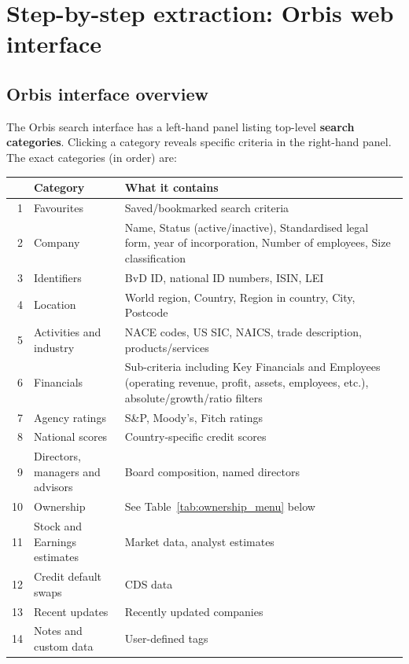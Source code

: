 \documentclass[11pt,a4paper]{article}
\newcommand{\menu}[1]{\textsf{#1}}
\begin{document}
\section{Step-by-step extraction: Orbis web interface}\label{sec:steps}

\subsection{Orbis interface overview}\label{sec:interface}

The Orbis search interface has a left-hand panel listing top-level \textbf{search categories}. Clicking a category reveals specific criteria in the right-hand panel. The exact categories (in order) are:

\begin{center}
\small
\begin{tabular}{@{}rll@{}}
\toprule
& \textbf{Category} & \textbf{What it contains} \\
\midrule
1 & \menu{Favourites} & Saved/bookmarked search criteria \\
2 & \menu{Company} & Name, \menu{Status} (active/inactive), \menu{Standardised legal form}, year of incorporation, \menu{Number of employees}, \menu{Size classification} \\
3 & \menu{Identifiers} & BvD ID, national ID numbers, ISIN, LEI \\
4 & \menu{Location} & World region, \menu{Country}, Region in country, City, Postcode \\
5 & \menu{Activities and industry} & NACE codes, US SIC, NAICS, trade description, products/services \\
6 & \menu{Financials} & Sub-criteria including \menu{Key Financials and Employees} (operating revenue, profit, assets, employees, etc.), absolute/growth/ratio filters \\
7 & \menu{Agency ratings} & S\&P, Moody's, Fitch ratings \\
8 & \menu{National scores} & Country-specific credit scores \\
9 & \menu{Directors, managers and advisors} & Board composition, named directors \\
10 & \menu{Ownership} & See Table~\ref{tab:ownership_menu} below \\
11 & \menu{Stock and Earnings estimates} & Market data, analyst estimates \\
12 & \menu{Credit default swaps} & CDS data \\
13 & \menu{Recent updates} & Recently updated companies \\
14 & \menu{Notes and custom data} & User-defined tags \\
\bottomrule
\end{tabular}
\end{center}
\end{document}
